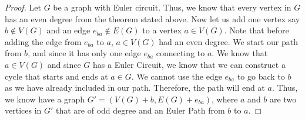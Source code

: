 \documentclass[12pt, fullpage]{article}
\begin{document}
\begin{proof}	
	Let $G$ be a graph with Euler circuit. Thus, we know that every vertex in $G$ has an even degree from the theorem stated above. Now let us add one vertex say $b \notin V(G) $ and an edge $e_{ba} \notin E(G)$ to a vertex $a \in V(G)$. Note that before adding the edge  from $e_{ba}$ to $a$, $a \in V(G)$ had an even degree. We start our path from $b$, and since it has only one edge $e_{ba}$ connecting to $a$. We know that $a \in V(G)$ and since $G$ has a Euler Circuit, we know that we can construct a cycle that starts and ends at $a \in G$. We cannot use the edge $e_{ba}$ to go back to $b$ as we have already included in our path. Therefore, the path will end at $a$. Thus, we know have a graph $G' = (V(G) + b, E(G) + e_{ba})$, where $a$ and $b$ are two vertices in $G'$ that are of odd degree and an Euler Path from $b$ to $a$.

\end{proof}
\end{document}
